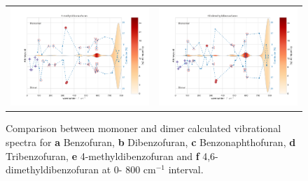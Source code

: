 \begin{figure}[H]
\begin{center}
{\begin{tabular}{c c}
					\includegraphics[scale=0.3]{image/P2-17d} & \includegraphics[scale=0.3]{image/P2-17e}\\
				\end{tabular}}
			\end{center}
			\caption{Comparison between momoner and dimer calculated vibrational spectra for \textbf{a} Benzofuran, \textbf{b} Dibenzofuran, \textbf{c} Benzonaphthofuran, \textbf{d} Tribenzofuran, \textbf{e} 4-methyldibenzofuran and \textbf{f} 4,6-dimethyldibenzofuran at 0- 800 cm$^{-1}$ interval.} \label{figP2-17ae}
		\end{figure}
		
